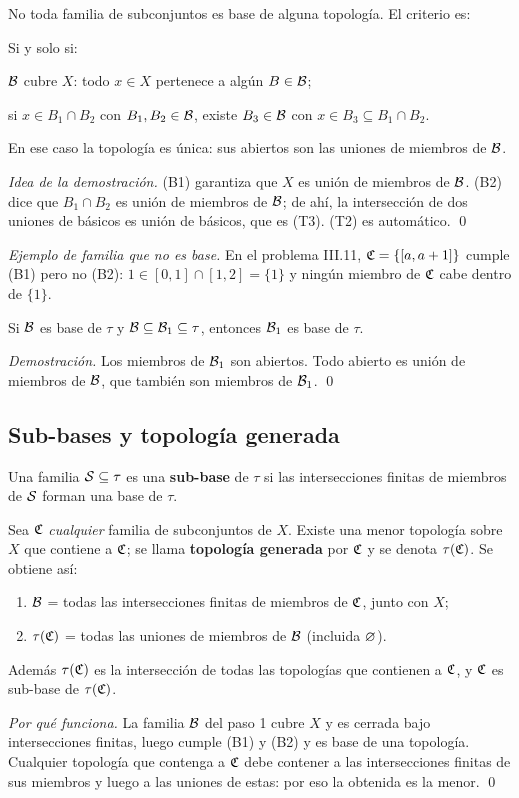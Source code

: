 No toda familia de subconjuntos es base de alguna topología. El criterio es:
\begin{teorema}
Si y solo si:
\begin{description}[leftmargin=1.4cm,labelwidth=1.0cm,itemsep=0.1em]
\item[(B1)] $\mathcal{B}$ cubre $X$: todo $x\in X$ pertenece a algún $B\in\mathcal{B}$;
\item[(B2)] si $x\in B_1\cap B_2$ con $B_1,B_2\in\mathcal{B}$, existe $B_3\in\mathcal{B}$ con $x\in B_3\subseteq B_1\cap B_2$.
\end{description}
En ese caso la topología es única: sus abiertos son las uniones de miembros de $\mathcal{B}$.
\end{teorema}
\emph{Idea de la demostración.} (B1) garantiza que $X$ es unión de miembros de $\mathcal{B}$. (B2) dice que $B_1\cap B_2$ es
unión de miembros de $\mathcal{B}$; de ahí, la intersección de dos uniones de básicos es unión de básicos, que es (T3). (T2) es
automático. \qed

\emph{Ejemplo de familia que no es base.} En el problema III.11, $\mathfrak{C}=\{[a,a+1]\}$ cumple (B1) pero no (B2):
$1\in[0,1]\cap[1,2]=\{1\}$ y ningún miembro de $\mathfrak{C}$ cabe dentro de $\{1\}$.

\begin{teorema}
Si $\mathcal{B}$ es base de $\tau$ y $\mathcal{B}\subseteq\mathcal{B}_1\subseteq\tau$, entonces $\mathcal{B}_1$ es base de $\tau$.
\end{teorema}
\emph{Demostración.} Los miembros de $\mathcal{B}_1$ son abiertos. Todo abierto es unión de miembros de $\mathcal{B}$, que también son
miembros de $\mathcal{B}_1$. \qed

\subsection{Sub-bases y topología generada}
\begin{definicion}
Una familia $\mathcal{S}\subseteq\tau$ es una \textbf{sub-base} de $\tau$ si las intersecciones finitas de miembros de $\mathcal{S}$
forman una base de $\tau$.
\end{definicion}
\begin{teorema}
Sea $\mathfrak{C}$ \emph{cualquier} familia de subconjuntos de $X$. Existe una menor topología sobre $X$ que contiene a $\mathfrak{C}$; se
llama \textbf{topología generada} por $\mathfrak{C}$ y se denota $\tau(\mathfrak{C})$. Se obtiene así:
\begin{enumerate}[leftmargin=1.6em]
\item $\mathcal{B}$ = todas las intersecciones finitas de miembros de $\mathfrak{C}$, junto con $X$;
\item $\tau(\mathfrak{C})$ = todas las uniones de miembros de $\mathcal{B}$ (incluida $\varnothing$).
\end{enumerate}
Además $\tau(\mathfrak{C})$ es la intersección de todas las topologías que contienen a $\mathfrak{C}$, y $\mathfrak{C}$ es sub-base de $\tau(\mathfrak{C})$.
\end{teorema}
\emph{Por qué funciona.} La familia $\mathcal{B}$ del paso 1 cubre $X$ y es cerrada bajo intersecciones finitas, luego cumple
(B1) y (B2) y es base de una topología. Cualquier topología que contenga a $\mathfrak{C}$ debe contener a las intersecciones
finitas de sus miembros y luego a las uniones de estas: por eso la obtenida es la menor. \qed

